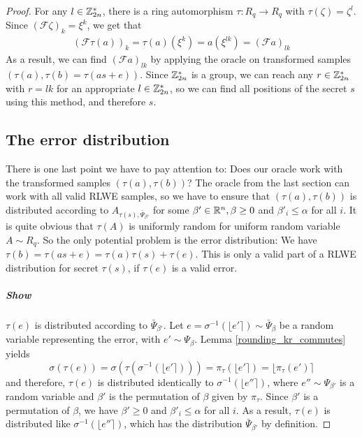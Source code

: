 \begin{proof}
For any $l \in \mathbb{Z}_{2n}^*$, there is a ring automorphism $\tau: R_q \to R_q$ with $\tau(\zeta) = \zeta^l$. Since $(\mathcal{F}\zeta)_k = \xi^k$, we get that
\begin{equation}
\begin{split}
(\mathcal{F}\tau(a))_k = \tau(a)(\xi^k) = a(\xi^{lk}) = (\mathcal{F}a)_{lk}
\end{split}\nonumber
\end{equation}
As a result, we can find $(\mathcal{F}a)_{lk}$ by applying the oracle on transformed samples $(\tau(a), \tau(b) = \tau(as + e))$. Since $\mathbb{Z}_{2n}^*$ is a group, we can reach any $r \in \mathbb{Z}_{2n}^*$ with $r = lk$ for an appropriate $l \in \mathbb{Z}_{2n}^*$, so we can find all positions of the secret $s$ using this method, and therefore $s$.

\subsection{The error distribution}
There is one last point we have to pay attention to: Does our oracle work with the transformed samples $(\tau(a), \tau(b))$? The oracle from the last section can work with all valid RLWE samples, so we have to ensure that $(\tau(a), \tau(b))$ is distributed according to $A_{\tau(s), \bar{\Psi}_{\beta'}}$ for some $\beta' \in \mathbb{R}^n, \beta \geq 0$ and $\beta'_i \leq \alpha$ for all $i$. It is quite obvious that $\tau(A)$ is uniformly random for uniform random variable $A \sim R_q$. So the only potential problem is the error distribution: We have $\tau(b) = \tau(as + e) = \tau(a) \tau(s) + \tau(e)$. This is only a valid part of a RLWE distribution for secret $\tau(s)$, if $\tau(e)$ is a valid error.

\subparagraph{Show} $\tau(e)$ is distributed according to $\bar{\Psi}_{\beta'}$. Let $e = \sigma^{-1}(\lfloor e' \rceil) \sim \bar{\Psi}_\beta$ be a random variable representing the error, with $e' \sim \Psi_\beta$. Lemma \ref{rounding_kr_commutes} yields
\begin{equation}
\sigma(\tau(e)) = \sigma(\tau(\sigma^{-1}( \lfloor e' \rceil ))) = \pi_\tau(\lfloor e' \rceil) = \lfloor \pi_\tau(e') \rceil \nonumber
\end{equation}
and therefore, $\tau(e)$ is distributed identically to $\sigma^{-1}(\lfloor e'' \rceil)$, where $e'' \sim \Psi_{\beta'}$ is a random variable and $\beta'$ is the permutation of $\beta$ given by $\pi_\tau$. Since $\beta'$ is a permutation of $\beta$, we have $\beta' \geq 0$ and $\beta'_i \leq \alpha$ for all $i$. As a result, $\tau(e)$ is distributed like $\sigma^{-1}(\lfloor e'' \rceil)$, which has the distribution $\bar{\Psi}_{\beta'}$ by definition.\qedhere
\end{proof}
